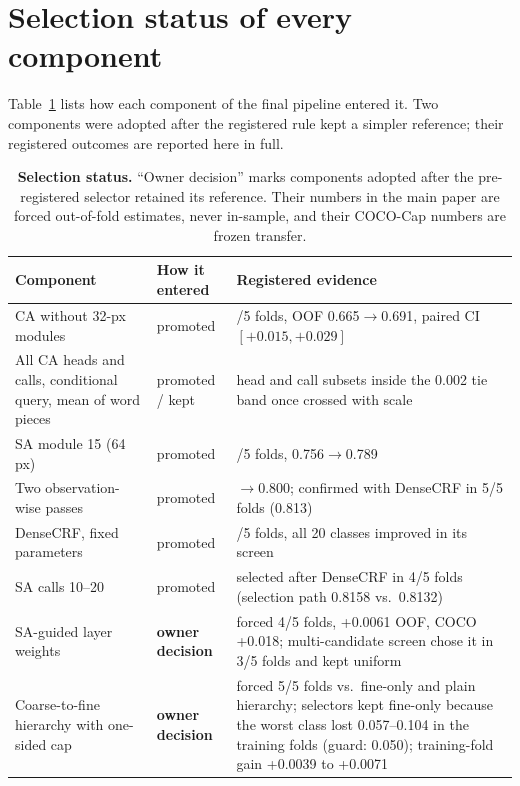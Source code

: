 \section{Selection status of every component}
\label{sec:supp_selection}
Table~\ref{tab:supp_status} lists how each component of the final pipeline entered it. Two components were adopted after the registered rule kept a simpler reference; their registered outcomes are reported here in full.

\begin{table}[t]
\centering
\footnotesize\setlength{\tabcolsep}{4pt}
\begin{tabular}{@{}>{\raggedright\arraybackslash}p{5.2cm}l>{\raggedright\arraybackslash}p{9.0cm}@{}}
\toprule
Component & How it entered & Registered evidence \\
\midrule
CA without 32-px modules & promoted & 4/5 folds, OOF 0.665$\rightarrow$0.691, paired CI $[+0.015,+0.029]$ \\
All CA heads and calls, conditional query, mean of word pieces & promoted / kept & head and call subsets inside the 0.002 tie band once crossed with scale \\
SA module 15 (64 px) & promoted & 5/5 folds, 0.756$\rightarrow$0.789 \\
Two observation-wise passes & promoted & 0.788$\rightarrow$0.800; confirmed with DenseCRF in 5/5 folds (0.813) \\
DenseCRF, fixed parameters & promoted & 5/5 folds, all 20 classes improved in its screen \\
SA calls 10--20 & promoted & selected after DenseCRF in 4/5 folds (selection path 0.8158 vs.\ 0.8132) \\
SA-guided layer weights & \textbf{owner decision} & forced 4/5 folds, +0.0061 OOF, COCO +0.018; multi-candidate screen chose it in 3/5 folds and kept uniform \\
Coarse-to-fine hierarchy with one-sided cap & \textbf{owner decision} & forced 5/5 folds vs.\ fine-only and plain hierarchy; selectors kept fine-only because the worst class lost 0.057--0.104 in the training folds (guard: 0.050); training-fold gain +0.0039 to +0.0071 \\
\bottomrule
\end{tabular}
\caption{\textbf{Selection status.} ``Owner decision'' marks components adopted after the pre-registered selector retained its reference. Their numbers in the main paper are forced out-of-fold estimates, never in-sample, and their COCO-Cap numbers are frozen transfer.}
\label{tab:supp_status}
\end{table}

